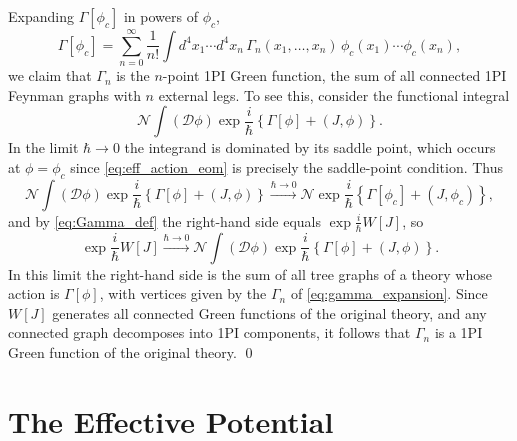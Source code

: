Expanding $\Gamma[\phi_c]$ in powers of $\phi_c$,
\begin{equation}
	\Gamma[\phi_c] = \sum_{n=0}^{\infty} \frac{1}{n!}
	\int d^4x_1\cdots d^4x_n\,
	\Gamma_n(x_1,\ldots,x_n)\,\phi_c(x_1)\cdots\phi_c(x_n),
	\label{eq:gamma_expansion}
\end{equation}
we claim that $\Gamma_n$ is the $n$-point 1PI Green function, the sum
of all connected 1PI Feynman graphs with $n$ external legs. To see this,
consider the functional integral
\begin{equation}
	\mathcal{N}\int(\mathcal{D}\phi)
	\exp\frac{i}{\hbar}\left\{\Gamma[\phi] + (J,\phi)\right\}.
\end{equation}
In the limit $\hbar\to 0$ the integrand is dominated by its saddle point,
which occurs at $\phi = \phi_c$ since \eqref{eq:eff_action_eom} is
precisely the saddle-point condition. Thus
\begin{equation}
	\mathcal{N}\int(\mathcal{D}\phi)
	\exp\frac{i}{\hbar}\left\{\Gamma[\phi] + (J,\phi)\right\}
	\xrightarrow{\hbar\to 0}
	\mathcal{N}\exp\frac{i}{\hbar}
	\left\{\Gamma[\phi_c] + (J,\phi_c)\right\},
\end{equation}
and by \eqref{eq:Gamma_def} the right-hand side equals
$\exp\frac{i}{\hbar}W[J]$, so
\begin{equation}
	\exp\frac{i}{\hbar}W[J]
	\xrightarrow{\hbar\to 0}
	\mathcal{N}\int(\mathcal{D}\phi)
	\exp\frac{i}{\hbar}\left\{\Gamma[\phi] + (J,\phi)\right\}.
\end{equation}
In this limit the right-hand side is the sum of all tree graphs of a
theory whose action is $\Gamma[\phi]$, with vertices given by the
$\Gamma_n$ of \eqref{eq:gamma_expansion}. Since $W[J]$ generates all
connected Green functions of the original theory, and any connected
graph decomposes into 1PI components, it follows that $\Gamma_n$ is a
1PI Green function of the original theory. \qed

\section{The Effective Potential}

